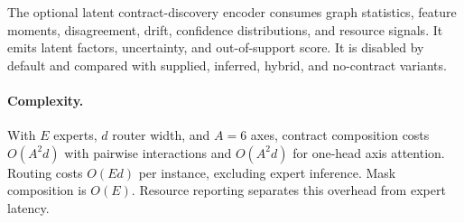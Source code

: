 The optional latent contract-discovery encoder consumes graph statistics, feature moments, disagreement, drift, confidence distributions, and resource signals. It emits latent factors, uncertainty, and out-of-support score. It is disabled by default and compared with supplied, inferred, hybrid, and no-contract variants.

\paragraph{Complexity.}
With \(E\) experts, \(d\) router width, and \(A=6\) axes, contract composition costs \(O(A^2d)\) with pairwise interactions and \(O(A^2d)\) for one-head axis attention. Routing costs \(O(Ed)\) per instance, excluding expert inference. Mask composition is \(O(E)\). Resource reporting separates this overhead from expert latency.
